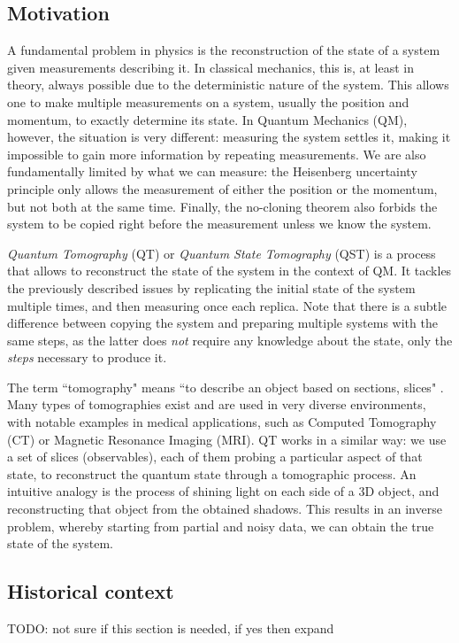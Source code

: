 \documentclass[12pt]{memoir}
\begin{document}
\subsection*{Motivation}
A fundamental problem in physics is the reconstruction of the state of a system given measurements describing it. In classical mechanics, this is, at least in theory, always possible due to the deterministic nature of the system. This allows one to make multiple measurements on a system, usually the position and momentum, to exactly determine its state. In Quantum Mechanics (QM), however, the situation is very different: measuring the system settles it, making it impossible to gain more information by repeating measurements. We are also fundamentally limited by what we can measure: the Heisenberg uncertainty principle only allows the measurement of either the position or the momentum, but not both at the same time. Finally, the no-cloning theorem also forbids the system to be copied right before the measurement unless we know the system.\medskip

\textit{Quantum Tomography} (QT) or \textit{Quantum State Tomography} (QST) is a process that allows to reconstruct the state of the system in the context of QM. It tackles the previously described issues by replicating the initial state of the system multiple times, and then measuring once each replica. Note that there is a subtle difference between copying the system and preparing multiple systems with the same steps, as the latter does \textit{not} require any knowledge about the state, only the \textit{steps} necessary to produce it.\medskip

The term ``tomography" means ``to describe an object based on sections, slices" \cite{wiki:tomography}. Many types of tomographies exist and are used in very diverse environments, with notable examples in medical applications, such as Computed Tomography (CT) or Magnetic Resonance Imaging (MRI). QT works in a similar way: we use a set of slices (observables), each of them probing a particular aspect of that state, to reconstruct the quantum state through a tomographic process. An intuitive analogy is the process of shining light on each side of a 3D object, and reconstructing that object from the obtained shadows. This results in an inverse problem, whereby starting from partial and noisy data, we can obtain the true state of the system.

\subsection*{Historical context}
TODO: not sure if this section is needed, if yes then expand\medbreak
\end{document}
